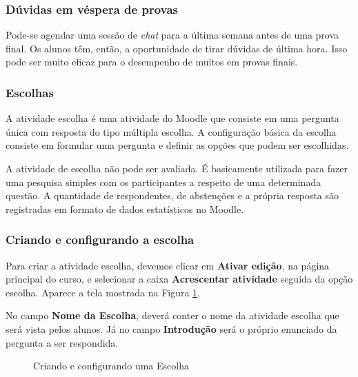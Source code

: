 \subsubsection{Dúvidas em véspera de provas}

Pode-se agendar uma sessão de  \textit{chat} para a última semana antes de uma prova final. Os alunos têm, então, a oportunidade de tirar dúvidas de última hora. Isso pode ser muito eficaz para o desempenho de muitos em provas finais.

\subsubsection{Escolhas}

A atividade escolha é uma atividade do Moodle que consiste em uma pergunta única com resposta do tipo múltipla escolha. A configuração básica da escolha consiste em formular uma pergunta e definir as opções que podem ser escolhidas.

A atividade de escolha não pode ser avaliada. É basicamente utilizada para fazer uma pesquisa simples com os participantes a respeito de uma determinada questão. A quantidade de respondentes, de abstenções e a própria resposta são registradas em formato de dados estatísticos no Moodle.

\subsubsection{Criando e configurando a escolha}

Para criar a atividade escolha, devemos clicar em \textbf{Ativar edição}, na página principal do curso, e selecionar a caixa \textbf{Acrescentar atividade} seguida da opção escolha. Aparece a tela mostrada na Figura \ref{fig:cap5_16}.

No campo \textbf{Nome da Escolha}, deverá conter o nome da atividade escolha que será vista pelos alunos. Já no campo \textbf{Introdução} será o próprio enunciado da pergunta a ser respondida.

\begin{figure}[htbp]
 \begin{center}
  \caption{Criando e configurando uma Escolha}
  \label{fig:cap5_16}
 \end{center}
\end{figure}

